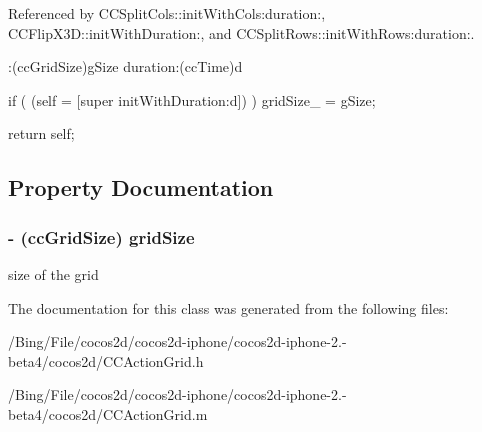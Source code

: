 Referenced by C\-C\-Split\-Cols\-::init\-With\-Cols\-:duration\-:, C\-C\-Flip\-X3\-D\-::init\-With\-Duration\-:, and C\-C\-Split\-Rows\-::init\-With\-Rows\-:duration\-:.


\begin{DoxyCode}
                  :(ccGridSize)gSize duration:(ccTime)d
{
        if ( (self = [super initWithDuration:d]) )
        {
                gridSize_ = gSize;
        }

        return self;
}
\end{DoxyCode}


\subsection{Property Documentation}
\hypertarget{interface_c_c_grid_action_a6b7df840de5e93a48b1061f60b0c5fa7}{
\subsubsection[{grid\-Size}]{\setlength{\rightskip}{0pt plus 5cm}-\/ ({\bf cc\-Grid\-Size}) {\bf grid\-Size}}}\label{interface_c_c_grid_action_a6b7df840de5e93a48b1061f60b0c5fa7}
size of the grid 

The documentation for this class was generated from the following files\-:\begin{DoxyCompactItemize}
\item 
/\-Bing/\-File/cocos2d/cocos2d-\/iphone/cocos2d-\/iphone-\/2.-\/beta4/cocos2d/C\-C\-Action\-Grid.\-h\item 
/\-Bing/\-File/cocos2d/cocos2d-\/iphone/cocos2d-\/iphone-\/2.-\/beta4/cocos2d/C\-C\-Action\-Grid.\-m\end{DoxyCompactItemize}
